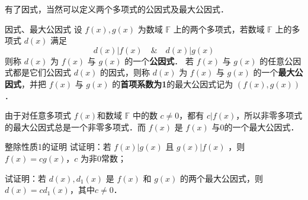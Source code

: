 有了因式，当然可以定义两个多项式的公因式及最大公因式．
\begin{definition}{因式、最大公因式}
设 $f(x),g(x)$ 为数域 $\mathbb{F}$ 上的两个多项式，若数域 $\mathbb{F}$ 上的多项式 $d(x)$ 满足
\begin{equation}
d(x)|f(x)\quad\&\quad d(x)|g(x)
\end{equation}
则称 $d(x)$ 为 $f(x)$ 与 $g(x)$ 的一个\textbf{公因式}．
若 $f(x)$ 与 $g(x)$ 的任意公因式都是它们公因式 $d(x)$ 的因式，则称 $d(x)$ 为 $f(x)$ 与 $g(x)$ 的一个\textbf{最大公因式}，并把 $f(x)$ 与 $g(x)$ 的\textbf{首项系数为1}的最大公因式记为 $(f(x),g(x))$．
\end{definition}

由于对任意多项式 $f(x)$和数域 $\mathbb{F}$ 中的数 $c\neq 0$，都有 $c|f(x)$，所以非零多项式的最大公因式总是一个非零多项式．而 $f(x)$ 是 $f(x)$ 与0的一个最大公因式．
\begin{example}{整除性质1的证明}
试证明：若 $f(x)|g(x)$ 且 $g(x)|f(x)$ ，则 $f(x)=cg(x)$，$c$ 为非0常数；
\end{example}

\begin{exercise}{}
试证明：若 $d(x),d_1(x)$ 是 $f(x)$ 和 $g(x)$ 的两个最大公因式，则 $d(x)=cd_1(x)$，其中$c\neq 0$．
\end{exercise}